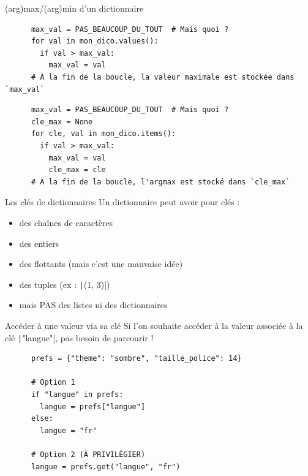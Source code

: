 \documentclass[10pt]{beamer}
\begin{document}
\begin{frame}[fragile]{(arg)max/(arg)min d'un dictionnaire}
  \begin{beamercodeblock}
    \begin{verbatim}
      max_val = PAS_BEAUCOUP_DU_TOUT  # Mais quoi ?
      for val in mon_dico.values():
        if val > max_val:
          max_val = val
      # À la fin de la boucle, la valeur maximale est stockée dans `max_val`
    \end{verbatim}
  \end{beamercodeblock}

  \pause
  
  \begin{beamercodeblock}
    \begin{verbatim}
      max_val = PAS_BEAUCOUP_DU_TOUT  # Mais quoi ?
      cle_max = None
      for cle, val in mon_dico.items():
        if val > max_val:
          max_val = val
          cle_max = cle
      # À la fin de la boucle, l'argmax est stocké dans `cle_max`
    \end{verbatim}
  \end{beamercodeblock}
\end{frame}

\begin{frame}[fragile]{Les clés de dictionnaires}
  Un dictionnaire peut avoir pour clés :
  \begin{itemize}
    \item des chaînes de caractères
    \item des entiers
    \item des flottants (mais c'est une mauvaise idée)
    \item des tuples (ex : \texttt|(1, 3)|)
    \item \alert{mais PAS des listes ni des dictionnaires}
  \end{itemize}
\end{frame}

\begin{frame}[fragile]{Accéder à une valeur via sa clé}
  Si l'on souhaite accéder à la valeur associée à la clé \texttt|"langue"|, pas besoin de parcourir !

  \pause
  
  \begin{beamercodeblock}
    \begin{verbatim}
      prefs = {"theme": "sombre", "taille_police": 14}

      # Option 1
      if "langue" in prefs:
        langue = prefs["langue"]
      else:
        langue = "fr"

      # Option 2 (À PRIVILÉGIER)
      langue = prefs.get("langue", "fr")
    \end{verbatim}
  \end{beamercodeblock}

\end{frame}
\end{document}
